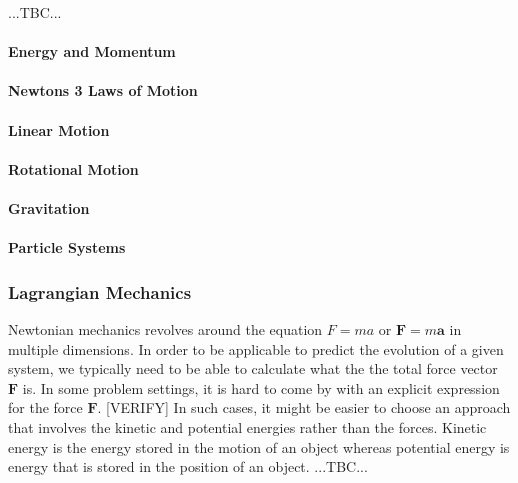 ...TBC...

\paragraph{Energy and Momentum}


\paragraph{Newtons 3 Laws of Motion}

\paragraph{Linear Motion}

\paragraph{Rotational Motion}

\paragraph{Gravitation}

\paragraph{Particle Systems}




\subsubsection{Lagrangian Mechanics}
Newtonian mechanics revolves around the equation $F = m a$ or $\mathbf{F} = m \mathbf{a}$ in multiple dimensions. In order to be applicable to predict the evolution of a given system, we typically need to be able to calculate what the the total force vector $\mathbf{F}$ is. In some problem settings, it is hard to come by with an explicit expression for the force $\mathbf{F}$. [VERIFY] In such cases, it might be easier to choose an approach that involves the kinetic and potential energies rather than the forces. Kinetic energy is the energy stored in the motion of an object whereas potential energy is energy that is stored in the position of an object. ...TBC...

